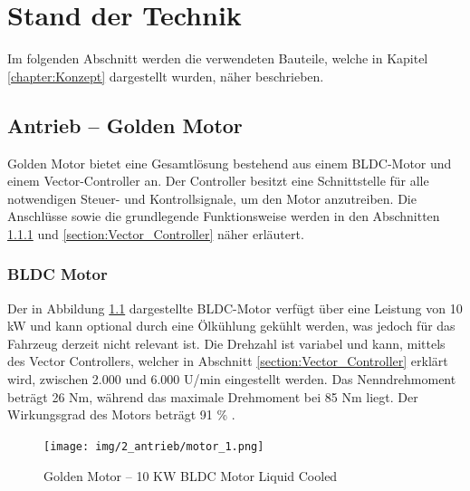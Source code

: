 \chapter{Stand der Technik}
\label{chapter:Stand_der_Technik}

Im folgenden Abschnitt werden die verwendeten Bauteile, welche in Kapitel \ref{chapter:Konzept} dargestellt wurden, näher beschrieben.


\section{Antrieb – Golden Motor}
\label{section:Antrieb}

Golden Motor bietet eine Gesamtlösung bestehend aus einem BLDC-Motor und einem Vector-Controller an. Der Controller besitzt eine Schnittstelle für alle notwendigen Steuer- und Kontrollsignale, um den Motor anzutreiben. Die Anschlüsse sowie die grundlegende Funktionsweise werden in den Abschnitten \ref{section:BLDC_Motor} und \ref{section:Vector_Controller} näher erläutert.

\subsection{BLDC Motor}
\label{section:BLDC_Motor}

Der in Abbildung \ref{BLDC_Motor:img:antrieb_motor} dargestellte BLDC-Motor verfügt über eine Leistung von 10 kW und kann optional durch eine Ölkühlung gekühlt werden, was jedoch für das Fahrzeug derzeit nicht relevant ist. Die Drehzahl ist variabel und kann, mittels des Vector Controllers, welcher in Abschnitt \ref{section:Vector_Controller} erklärt wird, zwischen 2.000 und 6.000 U/min eingestellt werden. Das Nenndrehmoment beträgt 26 Nm, während das maximale Drehmoment bei 85 Nm liegt. Der Wirkungsgrad des Motors beträgt 91 \% \cite{Golden_Motor:bldc_motor}.

\pagebreak[1]
\begin{figure}[!ht]
	\begin{center}
		\texttt{[image: img/2\_antrieb/motor\_1.png]}
		\caption{Golden Motor – 10 KW BLDC Motor Liquid Cooled}
		\label{BLDC_Motor:img:antrieb_motor}
	\end{center}
\end{figure}


